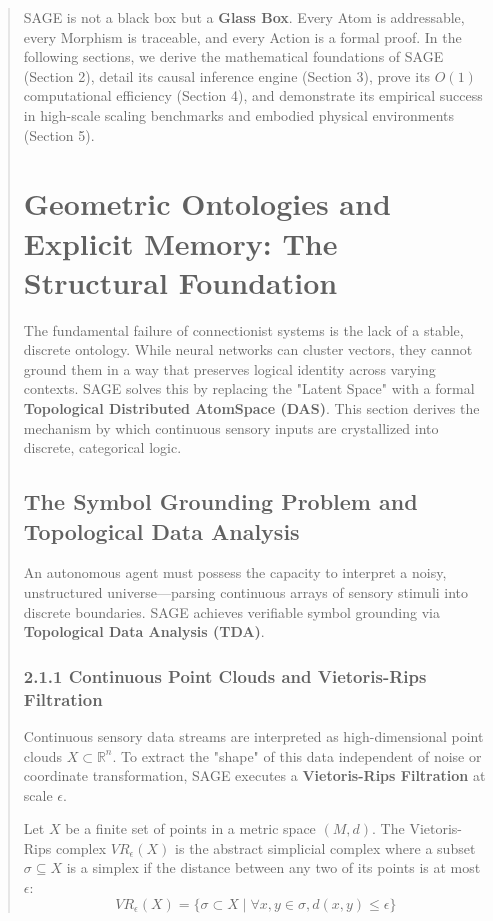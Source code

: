 \documentclass[10pt,twocolumn,letterpaper]{article}
\begin{document}
\begin{abstract}
SAGE is not a black box but a \textbf{Glass Box}. Every Atom is addressable, every Morphism is traceable, and every Action is a formal proof. In the following sections, we derive the mathematical foundations of SAGE (Section 2), detail its causal inference engine (Section 3), prove its $O(1)$ computational efficiency (Section 4), and demonstrate its empirical success in high-scale scaling benchmarks and embodied physical environments (Section 5).


\section{Geometric Ontologies and Explicit Memory: The Structural Foundation}

The fundamental failure of connectionist systems is the lack of a stable, discrete ontology. While neural networks can cluster vectors, they cannot ground them in a way that preserves logical identity across varying contexts. SAGE solves this by replacing the "Latent Space" with a formal \textbf{Topological Distributed AtomSpace (DAS)}. This section derives the mechanism by which continuous sensory inputs are crystallized into discrete, categorical logic.

\subsection{The Symbol Grounding Problem and Topological Data Analysis}

An autonomous agent must possess the capacity to interpret a noisy, unstructured universe—parsing continuous arrays of sensory stimuli into discrete boundaries. SAGE achieves verifiable symbol grounding via \textbf{Topological Data Analysis (TDA)}.

\subsubsection{2.1.1 Continuous Point Clouds and Vietoris-Rips Filtration}
Continuous sensory data streams are interpreted as high-dimensional point clouds $X \subset \mathbb{R}^n$. To extract the "shape" of this data independent of noise or coordinate transformation, SAGE executes a \textbf{Vietoris-Rips Filtration} at scale $\epsilon$.

Let $X$ be a finite set of points in a metric space $(M, d)$. The Vietoris-Rips complex $VR_\epsilon(X)$ is the abstract simplicial complex where a subset $\sigma \subseteq X$ is a simplex if the distance between any two of its points is at most $\epsilon$:
$$ VR_\epsilon(X) = \{ \sigma \subset X \mid \forall x,y \in \sigma, d(x,y) \le \epsilon \} $$


\end{abstract}
\end{document}
